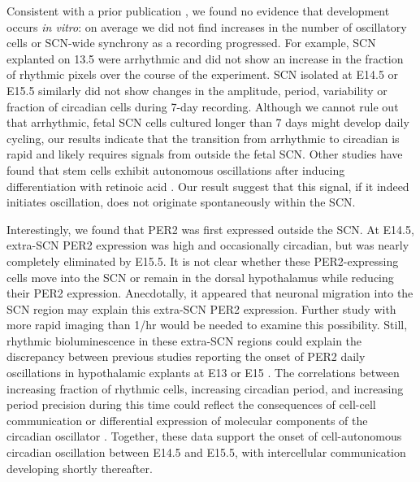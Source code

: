Consistent with a prior publication \cite{Landgraf2015}, we found no evidence that development occurs \textit{in vitro}: on average we did not find increases in the number of oscillatory cells or SCN-wide synchrony as a recording progressed.
For example, SCN explanted on 13.5 were arrhythmic and did not show an increase in the fraction of rhythmic pixels over the course of the experiment.
SCN isolated at E14.5 or E15.5 similarly did not show changes in the amplitude, period, variability or fraction of circadian cells during 7-day recording.
Although we cannot rule out that arrhythmic, fetal SCN cells cultured longer than 7 days might develop daily cycling, our results indicate that the transition from arrhythmic to circadian is rapid and likely requires signals from outside the fetal SCN.
Other studies have found that stem cells exhibit autonomous oscillations after inducing differentiation with retinoic acid \cite{Yagita2010, Inada2014}.
Our result suggest that this signal, if it indeed initiates oscillation, does not originate spontaneously within the SCN.

Interestingly, we found that PER2 was first expressed outside the SCN.
At E14.5, extra-SCN PER2 expression was high and occasionally circadian, but was nearly completely eliminated by E15.5. 
It is not clear whether these PER2-expressing cells move into the SCN or remain in the dorsal hypothalamus while reducing their PER2 expression.
Anecdotally, it appeared that neuronal migration into the SCN region may explain this extra-SCN PER2 expression.
Further study with more rapid imaging than 1/hr would be needed to examine this possibility.
Still, rhythmic bioluminescence in these extra-SCN regions could explain the discrepancy between previous studies reporting the onset of PER2 daily oscillations in hypothalamic explants at E13 or E15 \cite{Wreschnig2014, Landgraf2015}.
The correlations between increasing fraction of rhythmic cells, increasing circadian period, and increasing period precision during this time could reflect the consequences of cell-cell communication \cite{Webb2009} or differential expression of molecular components of the circadian oscillator \cite{VanDunk2011, Ono2016}.
Together, these data support the onset of cell-autonomous circadian oscillation between E14.5 and E15.5, with intercellular communication developing shortly thereafter.

